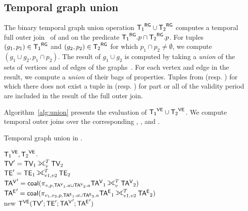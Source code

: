 \subsection{Temporal graph union}
\label{sec:algebra:outerjoin}

The binary temporal graph union operation $\mathsf{{T_1}^{RG}} \cup \mathsf{{T_2}^{RG}}$ computes
a temporal full outer join~\cite{Gao2005} of \trga and \trgb on the
predicate $\mathsf{{T_1}^{RG}}.p \cap \mathsf{{T_2}^{RG}}.p $. For tuples $(g_1, p_1) \in \mathsf{{T_1}^{RG}}$
and $(g_2, p_2) \in \mathsf{{T_2}^{RG}}$ for which $p_1 \cap p_2 \neq \emptyset$, we
compute $(g_1 \cup g_2, p_1 \cap p_2)$.  The result of $g_1 \cup g_2$
is computed by taking a {\em union} of the sets of vertices and of
edges of the graphs~\cite{GraphTheory}.  For each vertex and edge in
the result, we compute a {\em union} of their bags of properties.
Tuples from \trga (resp. \trgb) for which there does not exist a tuple
in \trgb (resp. \trga) for part or all of the validity period are
included in the result of the full outer join.  


Algorithm~\ref{alg:union} presents the evaluation of $\mathsf{{T_1}^{VE}} \cup
\mathsf{{T_2}^{VE}}$.  We compute temporal outer joins over the corresponding \tv,
\te, \tav and \tae.

\begin{algorithm}
\caption{Temporal graph union in \tve.}
\begin{algorithmic}[1]
\REQUIRE $\mathsf{{T_1}^{VE}}, \mathsf{{T_2}^{VE}}$.\\
\STATE $\tv' = \tv_1 \fullouterjoin^T_v \tv_2$\\
\STATE $\te' = \te_1 \fullouterjoin^T_{v1,v2} \te_2$\\
\STATE $\tav' = \cl (\pi_{v,p,\tav_1.a \cup \tav_2.a}\tav_1 \fullouterjoin^T_v \tav_2)$\\
\STATE $\tae' = \cl (\pi_{v_1,v_2,p,\tae_1.a \cup \tae_2.a}\tae_1 \fullouterjoin^T_{v1,v2} \tae_2)$\\
\RETURN new $\mathsf{T^{VE}} (\textsf{TV}';\textsf{TE}';\mathsf{TA^{V}}';\mathsf{TA^{E}}')$\\
\end{algorithmic}
\label{alg:union}
\end{algorithm}

